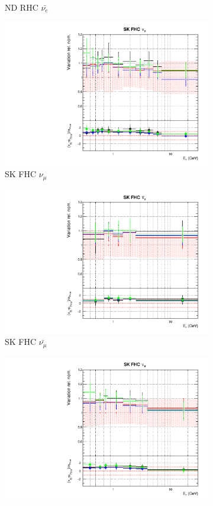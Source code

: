 \begin{figure}[t]
\begin{subfigure}{0.24\textwidth}
  \caption{ND RHC $\bar{\nu_e}$}
\end{subfigure}
\begin{subfigure}{0.24\textwidth}
  \centering
  \includegraphics[width=0.95\linewidth]{figs/detcovbinflux_8}
  \caption{SK FHC $\nu_{\mu}$}
\end{subfigure}
\begin{subfigure}{0.24\textwidth}
  \centering
  \includegraphics[width=0.95\linewidth]{figs/detcovbinflux_9}
  \caption{SK FHC $\bar{\nu_{\mu}}$}
\end{subfigure}
\begin{subfigure}{0.24\textwidth}
  \centering
  \includegraphics[width=0.95\linewidth]{figs/detcovbinflux_10}

\end{subfigure}
\end{figure}
